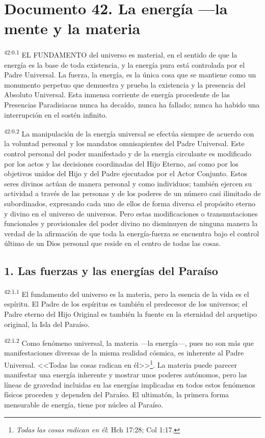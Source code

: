 \chapter{Documento 42. La energía ---la mente y la materia}
\par
\textsuperscript{42:0.1} EL FUNDAMENTO del universo es material, en el sentido de que la energía es la base de toda existencia, y la energía pura está controlada por el Padre Universal. La fuerza, la energía, es la única cosa que se mantiene como un monumento perpetuo que demuestra y prueba la existencia y la presencia del Absoluto Universal. Esta inmensa corriente de energía procedente de las Presencias Paradisiacas nunca ha decaído, nunca ha fallado; nunca ha habido una interrupción en el sostén infinito.

\par
\textsuperscript{42:0.2} La manipulación de la energía universal se efectúa siempre de acuerdo con la voluntad personal y los mandatos omnisapientes del Padre Universal. Este control personal del poder manifestado y de la energía circulante es modificado por los actos y las decisiones coordinadas del Hijo Eterno, así como por los objetivos unidos del Hijo y del Padre ejecutados por el Actor Conjunto. Estos seres divinos actúan de manera personal y como individuos; también ejercen su actividad a través de las personas y de los poderes de un número casi ilimitado de subordinados, expresando cada uno de ellos de forma diversa el propósito eterno y divino en el universo de universos. Pero estas modificaciones o transmutaciones funcionales y provisionales del poder divino no disminuyen de ninguna manera la verdad de la afirmación de que toda la energía-fuerza se encuentra bajo el control último de un Dios personal que reside en el centro de todas las cosas.

\section*{1. Las fuerzas y las energías del Paraíso}
\par
\textsuperscript{42:1.1} El fundamento del universo es la materia, pero la esencia de la vida es el espíritu. El Padre de los espíritus es también el predecesor de los universos; el Padre eterno del Hijo Original es también la fuente en la eternidad del arquetipo original, la Isla del Paraíso.

\par
\textsuperscript{42:1.2} Como fenómeno universal, la materia ---la energía---, pues no son más que manifestaciones diversas de la misma realidad cósmica, es inherente al Padre Universal. <<Todas las cosas radican en él>>\footnote{\textit{Todas las cosas radican en él}: Hch 17:28; Col 1:17.}. La materia puede parecer manifestar una energía inherente y mostrar unos poderes autónomos, pero las líneas de gravedad incluidas en las energías implicadas en todos estos fenómenos físicos proceden y dependen del Paraíso. El ultimatón, la primera forma mensurable de energía, tiene por núcleo al Paraíso.


